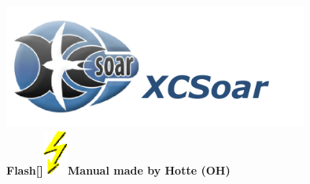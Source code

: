 \documentclass[german,a4paper,twoside]{scrreprt} %
\def\bbblitz{\includegraphics[height=4.0em]{Bilder/blitz1.png}}
\begin{document}
\vspace*{4cm}
\begin{center}
\includegraphics[width=10cm]{xcsoar-title.png}\\[2em]
{\Large\textbf{\textsf{Flash\raisebox{-\baselineskip}[\ht\strutbox]{\bbblitz}Manual made by Hotte (OH)}}}\\


\end{center}

\tableofcontents
\printindex
\end{document}
